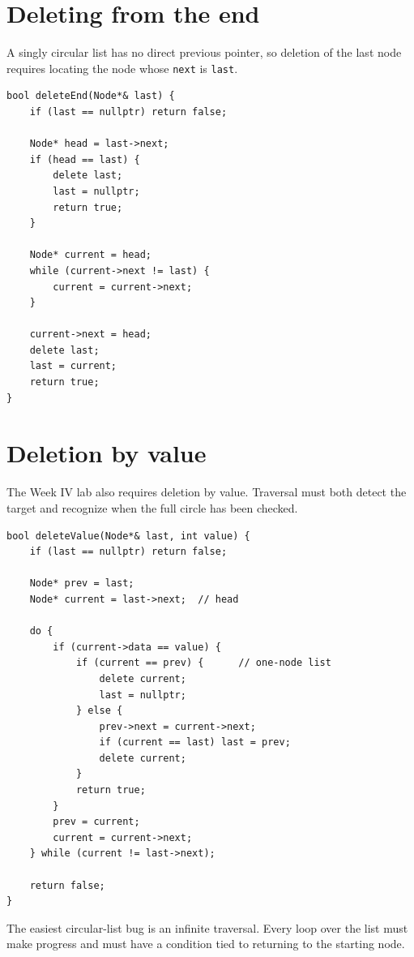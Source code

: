 \section{Deleting from the end}

A singly circular list has no direct previous pointer, so deletion of the last node requires locating the node whose \texttt{next} is \texttt{last}.

\begin{lstlisting}
bool deleteEnd(Node*& last) {
    if (last == nullptr) return false;

    Node* head = last->next;
    if (head == last) {
        delete last;
        last = nullptr;
        return true;
    }

    Node* current = head;
    while (current->next != last) {
        current = current->next;
    }

    current->next = head;
    delete last;
    last = current;
    return true;
}
\end{lstlisting}

\section{Deletion by value}

The Week IV lab also requires deletion by value. Traversal must both detect the target and recognize when the full circle has been checked.

\begin{lstlisting}
bool deleteValue(Node*& last, int value) {
    if (last == nullptr) return false;

    Node* prev = last;
    Node* current = last->next;  // head

    do {
        if (current->data == value) {
            if (current == prev) {      // one-node list
                delete current;
                last = nullptr;
            } else {
                prev->next = current->next;
                if (current == last) last = prev;
                delete current;
            }
            return true;
        }
        prev = current;
        current = current->next;
    } while (current != last->next);

    return false;
}
\end{lstlisting}

\begin{pitfall}
The easiest circular-list bug is an infinite traversal. Every loop over the list must make progress and must have a condition tied to returning to the starting node.
\end{pitfall}

